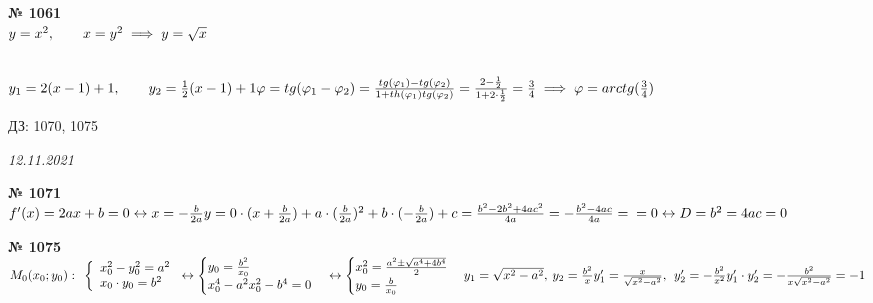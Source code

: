 \documentclass[12pt]{article}
\newenvironment{task}[1][0]{\vspace{.5cm} {\textbf{№ #1} \vspace{.5cm}\\ }\large}{}
\begin{document}
{\newpage
\begin{task}[1061]
$y=x^2, \qquad x=y^2 \implies y=\sqrt{x}\\$

\\
$y_1=2(x-1)+1, \qquad y_2=\frac{1}{2}(x-1)+1\\
\varphi = tg(\varphi_1 - \varphi_2) = \frac{tg(\varphi_1) - tg(\varphi_2)}{1+th(\varphi_1)tg(\varphi_2)} = \frac{2 - \frac{1}{2}}{1 + 2 \cdot \frac{1}{2}} = \frac{3}{4} \implies \varphi = arctg(\frac{3}{4})\\
$
\end{task}

ДЗ: 1070, 1075

\vspace{.5cm}
{\hfill \textit{12.11.2021}}

\begin{task}[1071]
$
f'(x)=2ax+b=0 \leftrightarrow x = -\frac{b}{2a}\\
y=0\cdot (x+\frac{b}{2a})+a\cdot (\frac{b}{2a})^2+b\cdot (-\frac{b}{2a})+c= \frac{b^2-2b^2+4ac^2}{4a}=-\frac{b^2-4ac}{4a}=\\=0 \leftrightarrow D=b^2=4ac=0\\
$
\end{task}

\begin{task}[1075]
$
M_0(x_0; y_0): \:\:
\left\{
\begin{array}{l}
	x_0^2-y_0^2=a^2\\
	x_0 \cdot y_0=b^2\\
\end{array}\right. \leftrightarrow
\begin{cases}
	y_0=\frac{b^2}{x_0}\\
	x_0^4-a^2x_0^2-b^4=0\\
\end{cases} \leftrightarrow
\begin{cases}
	x_0^2=\frac{a^2\pm\sqrt{a^4+4b^4}}{2}\\
	y_0=\frac{b}{x_0}
\end{cases}
\\
y_1=\sqrt{x^2-a^2}, \: y_2=\frac{b^2}{x}\\
y_1'=\frac{x}{\sqrt{x^2-a^2}}, \:\: y_2'=-\frac{b^2}{x^2}\\
y_1'\cdot y_2' = -\frac{b^2}{x\sqrt{x^2-a^2}}=-1
$
\end{task}

}
\end{document}
